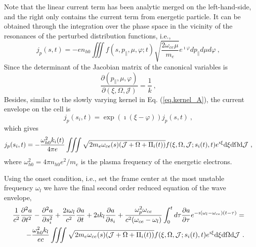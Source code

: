 Note that the linear current term has been analytic merged on the left-hand-side, and the right only contains the current term from energetic particle. It can be obtained through the integration over the phase space in the vicinity of the resonances of the perturbed distribution functions, i.e.,
\begin{equation}
    j_p(s, t)=-e n_{h 0} \iiint f\left(s, p_{\parallel}, \mu, \varphi ; t\right) \sqrt{\frac{2 \omega_{ce} \mu}{m_{e}}} e^{\imath \varphi} d p_{\parallel} d \mu d \varphi~,
\end{equation}
Since the determinant of the Jacobian matrix of the canonical variables is 
\begin{equation}
    \frac{\partial (p_\|,\mu,\varphi)}{\partial (\xi,\Omega,\mathcal{J})} = \frac{1}{k}~,
\end{equation}
Besides, similar to the slowly varying kernel in Eq. (\ref{eq.kernel_A}), the current envelope on the cell is
\begin{equation}
j_{p}(s_i,t) = \exp(\imath(\xi-\varphi))j_{p}(s,t)~,
\end{equation}
which gives
\begin{equation}\label{eq.nonlinear_J}
    j_p(s_i,t) = - \frac{\omega_{h0}^2k_i(t)}{4\pi e}\iiint \sqrt{2m_e\omega_{ce}(s)(\mathcal{J}+\Omega+\Pi_i(t))}f(\xi,\Omega,\mathcal{J};s_i(t),t)e^{\imath \xi} \rm d \xi \rm d \Omega \rm d \mathcal{J}~,
\end{equation}
where $\omega^2_{h0} = 4 \pi n_{h0} e^2 /m_e$ is the plasma frequency of the energetic electrons.

Using the onset condition, i.e., set the frame center at the most unstable frequency $\omega_l$ we have the final second order reduced equation of the wave envelope, 
\begin{equation}
    \begin{aligned}
    \frac{1}{c^2}\frac{\partial^2 a}{\partial t^2} - \frac{\partial^2 a}{\partial s_i^2} + \frac{2\imath\omega_l}{c^2}\frac{\partial a}{\partial t} + 2\imath k_l\frac{\partial a}{\partial s_i} + \frac{\omega_p^2 \omega_{c e}}{c^2(\omega_{c e}-\omega_l)} \int_0^t d \tau \frac{\partial a}{\partial \tau} e^{-\imath\left(\omega_l-\omega_{c e}\right)(t-\tau)} = 
    \\
    - \frac{\omega_{h0}^2k_l}{ec}\iiint \sqrt{2m_e\omega_{ce}(s)(\mathcal{J}+\Omega+\Pi_i(t))}f(\xi,\Omega,\mathcal{J};s_i(t),t)e^{\imath \xi} \rm d \xi \rm d \Omega \rm d \mathcal{J}~.    
    \end{aligned}
\end{equation}
